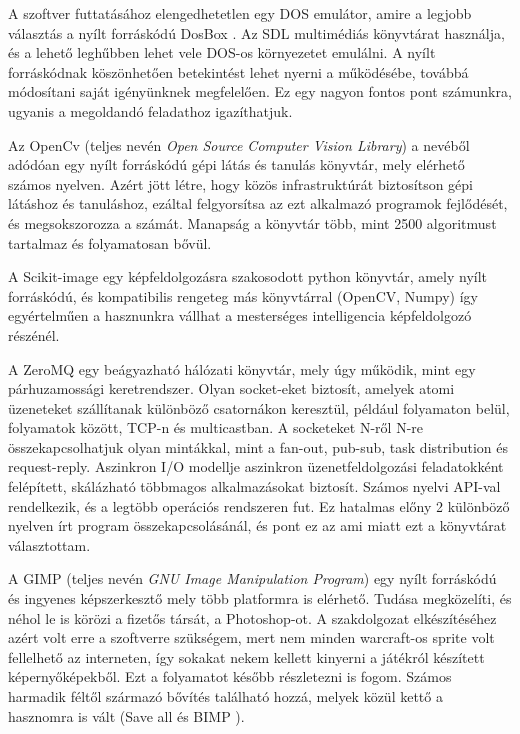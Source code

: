 

A szoftver futtatásához elengedhetetlen egy DOS emulátor, amire a legjobb választás a nyílt forráskódú DosBox \cite{dosbox}. Az SDL multimédiás könyvtárat használja, és a lehető leghűbben lehet vele DOS-os környezetet emulálni. A nyílt forráskódnak köszönhetően betekintést lehet nyerni a működésébe, továbbá módosítani saját igényünknek megfelelően. Ez egy nagyon fontos pont számunkra, ugyanis a megoldandó feladathoz igazíthatjuk.

Az OpenCv \cite{opencv} (teljes nevén \textit{Open Source Computer Vision Library}) a nevéből adódóan egy nyílt forráskódú gépi látás és tanulás könyvtár, mely elérhető számos nyelven. Azért jött létre, hogy közös infrastruktúrát biztosítson gépi látáshoz és tanuláshoz, ezáltal felgyorsítsa az ezt alkalmazó programok fejlődését, és megsokszorozza a számát. Manapság a könyvtár több, mint 2500 algoritmust tartalmaz és folyamatosan bővül.


A Scikit-image egy képfeldolgozásra szakosodott python könyvtár, amely nyílt forráskódú, és kompatibilis rengeteg más könyvtárral (OpenCV, Numpy) így egyértelműen a hasznunkra vállhat a mesterséges intelligencia képfeldolgozó részénél.


A ZeroMQ \cite{zmq} egy beágyazható hálózati könyvtár, mely úgy működik, mint egy párhuzamossági keretrendszer. Olyan socket-eket biztosít, amelyek atomi üzeneteket szállítanak különböző csatornákon keresztül, például folyamaton belül, folyamatok között, TCP-n és multicastban. A socketeket N-ről N-re összekapcsolhatjuk olyan mintákkal, mint a fan-out, pub-sub, task distribution és request-reply. Aszinkron I/O modellje aszinkron üzenetfeldolgozási feladatokként felépített, skálázható többmagos alkalmazásokat biztosít. Számos nyelvi API-val rendelkezik, és a legtöbb operációs rendszeren fut. Ez hatalmas előny 2 különböző nyelven írt program összekapcsolásánál, és pont ez az ami miatt ezt a könyvtárat választottam.

A GIMP (teljes nevén \textit{GNU Image Manipulation Program}) egy nyílt forráskódú és ingyenes képszerkesztő mely több platformra is elérhető. Tudása megközelíti, és néhol le is körözi a fizetős társát, a Photoshop-ot. A szakdolgozat elkészítéséhez azért volt erre a szoftverre szükségem, mert nem minden warcraft-os sprite volt fellelhető az interneten, így sokakat nekem kellett kinyerni a játékról készített képernyőképekből. Ezt a folyamatot később részletezni is fogom. Számos harmadik féltől származó bővítés található hozzá, melyek közül kettő a hasznomra is vált (Save all \cite{saveall} és BIMP \cite{bimp}).


